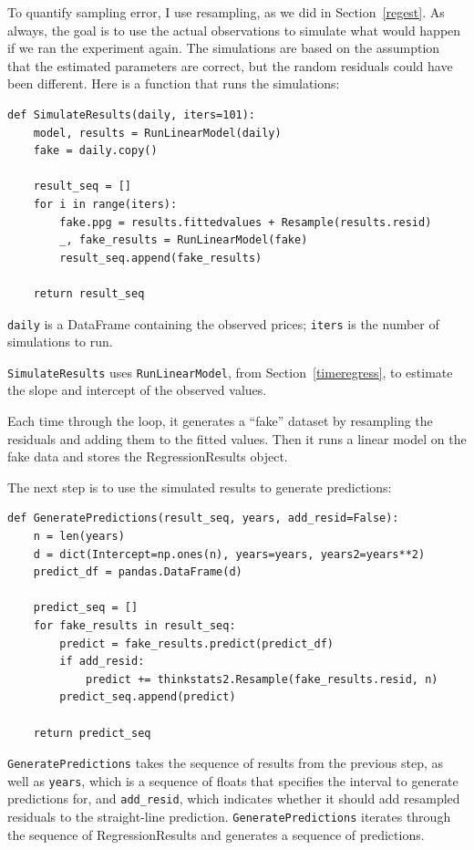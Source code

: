 \documentclass[12pt]{book}
\begin{document}
To quantify sampling error, I use resampling, as we did in
Section~\ref{regest}.  As always, the goal is to use the actual
observations to simulate what would happen if we ran the experiment
again.  The simulations are based on the assumption that the estimated
parameters are correct, but the random residuals could have been
different.  Here is a function that runs the simulations:

\begin{verbatim}
def SimulateResults(daily, iters=101):
    model, results = RunLinearModel(daily)
    fake = daily.copy()
    
    result_seq = []
    for i in range(iters):
        fake.ppg = results.fittedvalues + Resample(results.resid)
        _, fake_results = RunLinearModel(fake)
        result_seq.append(fake_results)

    return result_seq
\end{verbatim}

{\tt daily} is a DataFrame containing the observed prices;
{\tt iters} is the number of simulations to run.

{\tt SimulateResults} uses {\tt RunLinearModel}, from
Section~\ref{timeregress}, to estimate the slope and intercept
of the observed values.

Each time through the loop, it generates a ``fake'' dataset by
resampling the residuals and adding them to the fitted values.  Then
it runs a linear model on the fake data and stores the RegressionResults
object.

The next step is to use the simulated results to generate predictions:

\begin{verbatim}
def GeneratePredictions(result_seq, years, add_resid=False):
    n = len(years)
    d = dict(Intercept=np.ones(n), years=years, years2=years**2)
    predict_df = pandas.DataFrame(d)
    
    predict_seq = []
    for fake_results in result_seq:
        predict = fake_results.predict(predict_df)
        if add_resid:
            predict += thinkstats2.Resample(fake_results.resid, n)
        predict_seq.append(predict)

    return predict_seq
\end{verbatim}

{\tt GeneratePredictions} takes the sequence of results from the
previous step, as well as {\tt years}, which is a sequence of
floats that specifies the interval to generate predictions for,
and \verb"add_resid", which indicates whether it should add resampled
residuals to the straight-line prediction.
{\tt GeneratePredictions} iterates through the sequence of
RegressionResults and generates a sequence of predictions.
\end{document}
